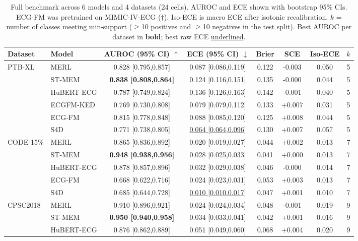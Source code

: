 \begin{table}[t]
\centering
\caption{Full benchmark across 6 models and 4 datasets (24 cells). AUROC and ECE shown with bootstrap 95\% CIs. ECG-FM was pretrained on MIMIC-IV-ECG ($\dagger$). Iso-ECE is macro ECE after isotonic recalibration. $k$ = number of classes meeting min-support ($\geq$10 positives and $\geq$10 negatives in the test split). Best AUROC per dataset in \textbf{bold}; best raw ECE \underline{underlined}.}
\label{tab:full-benchmark}
\small
\begin{tabular}{llcccccc}
\toprule
Dataset & Model & AUROC (95\% CI) $\uparrow$ & ECE (95\% CI) $\downarrow$ & Brier & SCE & Iso-ECE & $k$ \\
\midrule
  PTB-XL & MERL & 0.828 [0.795,0.857] & 0.087 [0.086,0.119] & 0.122 & -0.003 & 0.050 & 5 \\
   & ST-MEM & \textbf{0.838 [0.808,0.864]} & 0.124 [0.116,0.151] & 0.135 & -0.000 & 0.044 & 5 \\
   & HuBERT-ECG & 0.787 [0.749,0.824] & 0.136 [0.126,0.163] & 0.142 & -0.001 & 0.040 & 5 \\
   & ECGFM-KED & 0.769 [0.730,0.808] & 0.079 [0.079,0.112] & 0.133 & +0.007 & 0.031 & 5 \\
   & ECG-FM & 0.815 [0.778,0.848] & 0.088 [0.085,0.120] & 0.125 & +0.008 & 0.044 & 5 \\
   & S4D & 0.771 [0.738,0.805] & \underline{0.064 [0.064,0.096]} & 0.130 & +0.007 & 0.057 & 5 \\
  \midrule
  CODE-15\% & MERL & 0.865 [0.836,0.892] & 0.020 [0.019,0.027] & 0.044 & +0.002 & 0.013 & 7 \\
   & ST-MEM & \textbf{0.948 [0.938,0.956]} & 0.028 [0.025,0.033] & 0.041 & +0.000 & 0.013 & 7 \\
   & HuBERT-ECG & 0.878 [0.857,0.896] & 0.032 [0.029,0.038] & 0.046 & -0.000 & 0.014 & 7 \\
   & ECG-FM & 0.668 [0.622,0.716] & 0.024 [0.023,0.031] & 0.053 & +0.003 & 0.013 & 7 \\
   & S4D & 0.685 [0.644,0.728] & \underline{0.010 [0.010,0.017]} & 0.047 & +0.001 & 0.010 & 7 \\
  \midrule
  CPSC2018 & MERL & 0.910 [0.896,0.921] & 0.024 [0.024,0.034] & 0.048 & -0.001 & 0.019 & 9 \\
   & ST-MEM & \textbf{0.950 [0.940,0.958]} & 0.034 [0.033,0.041] & 0.042 & +0.001 & 0.016 & 9 \\
   & HuBERT-ECG & 0.876 [0.862,0.889] & 0.051 [0.049,0.060] & 0.068 & +0.004 & 0.020 & 9 \\

\end{tabular}
\end{table}
